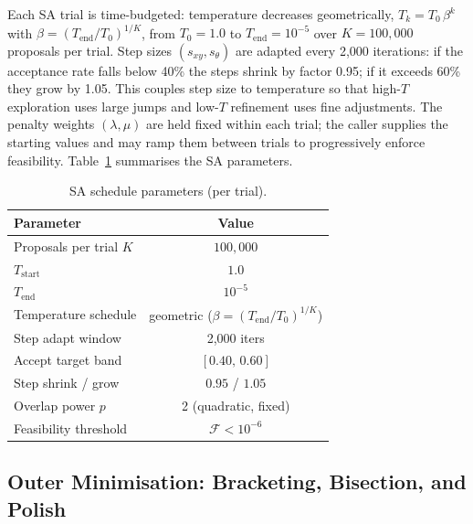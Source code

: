 \documentclass[10pt,twocolumn]{article}
\begin{document}
Each SA trial is time-budgeted: temperature decreases geometrically,
$T_k = T_0\,\beta^k$ with $\beta = (T_{\mathrm{end}}/T_0)^{1/K}$,
from $T_0 = 1.0$ to $T_{\mathrm{end}} = 10^{-5}$ over $K=100{,}000$
proposals per trial.  Step sizes $(s_{xy}, s_\theta)$ are adapted
every 2{,}000 iterations: if the acceptance rate falls below 40\% the
steps shrink by factor 0.95; if it exceeds 60\% they grow by 1.05.
This couples step size to temperature so that high-$T$ exploration
uses large jumps and low-$T$ refinement uses fine adjustments.  The
penalty weights $(\lambda,\mu)$ are held fixed within each trial;
the caller supplies the starting values and may ramp them
between trials to progressively enforce feasibility.
Table~\ref{tab:phases} summarises the SA parameters.

\begin{table}[t]
\centering\small
\setlength{\tabcolsep}{4.5pt}
\caption{SA schedule parameters (per trial).}
\label{tab:phases}
\begin{tabular}{lc}
\toprule
Parameter & Value \\
\midrule
Proposals per trial $K$ & $100{,}000$ \\
$T_{\mathrm{start}}$    & $1.0$ \\
$T_{\mathrm{end}}$      & $10^{-5}$ \\
Temperature schedule    & geometric ($\beta = (T_{\mathrm{end}}/T_0)^{1/K}$) \\
Step adapt window       & 2{,}000 iters \\
Accept target band      & $[0.40,\,0.60]$ \\
Step shrink / grow      & $0.95$ / $1.05$ \\
Overlap power $p$       & 2 (quadratic, fixed) \\
Feasibility threshold   & $\mathcal{F} < 10^{-6}$ \\
\bottomrule
\end{tabular}
\end{table}

\subsection{Outer Minimisation: Bracketing, Bisection, and Polish}
\end{document}
